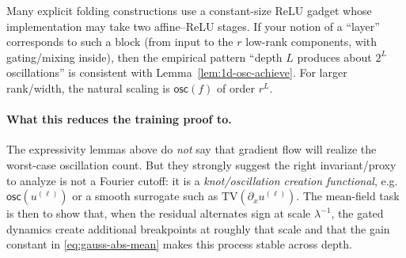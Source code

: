 \begin{remark}
Many explicit folding constructions use a constant-size ReLU gadget whose implementation may take two affine--ReLU stages.
If your notion of a ``layer'' corresponds to such a block (from input to the $r$ low-rank components, with gating/mixing inside), then the empirical pattern ``depth $L$ produces about $2^L$ oscillations'' is consistent with Lemma~\ref{lem:1d-osc-achieve}.
For larger rank/width, the natural scaling is $\mathsf{osc}(f)$ of order $r^L$.
\end{remark}

\paragraph{What this reduces the training proof to.}
The expressivity lemmas above do \emph{not} say that gradient flow will realize the worst-case oscillation count.
But they strongly suggest the right invariant/proxy to analyze is not a Fourier cutoff: it is a \emph{knot/oscillation creation functional}, e.g.\ $\mathsf{osc}(u^{(\ell)})$ or a smooth surrogate such as $\mathrm{TV}(\partial_x u^{(\ell)})$.
The mean-field task is then to show that, when the residual alternates sign at scale $\lambda^{-1}$, the gated dynamics create additional breakpoints at roughly that scale and that the gain constant in \eqref{eq:gauss-abs-mean} makes this process stable across depth.
